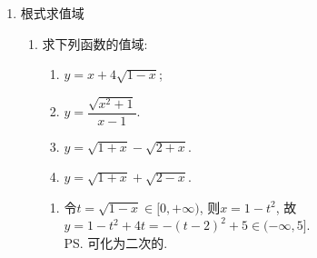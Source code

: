 \begin{enumerate}
\item 根式求值域
\begin{enumerate}
    \item 求下列函数的值域:
    \begin{enumerate}
    \item $y=x+4\sqrt{1-x}$; 
    \item $y=\dfrac{\sqrt{x^2+1}}{x-1}$. 
    \item $y = \sqrt{1+x} - \sqrt{2+x}$.
    \item $y = \sqrt{1+x} + \sqrt{2-x}$.
    \end{enumerate}
    \begin{jieda}
    \begin{enumerate}
    \item 令$t=\sqrt{1-x}\in[0,+\infty)$, 则$x=1-t^2$, 故$y=1-t^2+4t=-(t-2)^2+5\in(-\infty,5]$. \\
    \ps 可化为二次的. 
    

\end{enumerate}
\end{jieda}
\end{enumerate}
\end{enumerate}
